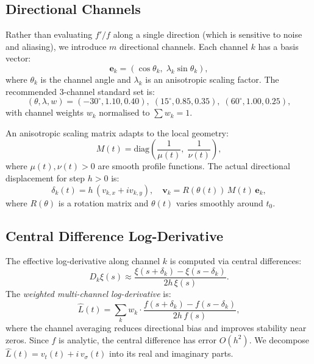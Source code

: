 \documentclass[11pt, a4paper]{article}
\theoremstyle{definition}
\theoremstyle{plain}
\newcommand{\xif}{\xi}                      %
\newcommand{\Lhat}{\hat{L}}                %
\begin{document}
\subsection{Directional Channels}
\label{sec:channels}

Rather than evaluating $f'/f$ along a single direction (which is
sensitive to noise and aliasing), we introduce $m$ directional channels.
Each channel $k$ has a basis vector:
\begin{equation}
  \mathbf{e}_k = (\cos\theta_k, \;\lambda_k\sin\theta_k),
  \label{eq:channel_vector}
\end{equation}
where $\theta_k$ is the channel angle and $\lambda_k$ is an anisotropic
scaling factor. The recommended 3-channel standard set is:
\begin{equation}
  (\theta, \lambda, w) = (-30^\circ, 1.10, 0.40), \;
  (15^\circ, 0.85, 0.35), \;
  (60^\circ, 1.00, 0.25),
  \label{eq:channel_set}
\end{equation}
with channel weights $w_k$ normalised to $\sum w_k = 1$.

An anisotropic scaling matrix adapts to the local geometry:
\begin{equation}
  M(t) = \mathrm{diag}\!\left(\frac{1}{\mu(t)},\;
  \frac{1}{\nu(t)}\right),
  \label{eq:aniso_scale}
\end{equation}
where $\mu(t), \nu(t) > 0$ are smooth profile functions. The actual
directional displacement for step $h > 0$ is:
\begin{equation}
  \delta_k(t) = h\,(v_{k,x} + iv_{k,y}), \quad
  \mathbf{v}_k = R(\theta(t))\,M(t)\,\mathbf{e}_k,
  \label{eq:displacement}
\end{equation}
where $R(\theta)$ is a rotation matrix and $\theta(t)$ varies smoothly
around $t_0$.


\subsection{Central Difference Log-Derivative}
\label{sec:central_diff}

The effective log-derivative along channel $k$ is computed via central
differences:
\begin{equation}
  D_k\xif(s) \approx
  \frac{\xif(s + \delta_k) - \xif(s - \delta_k)}{2h\,\xif(s)}.
  \label{eq:central_diff}
\end{equation}
The \textit{weighted multi-channel log-derivative} is:
\begin{equation}
  \Lhat(t) = \sum_k w_k \cdot
  \frac{f(s + \delta_k) - f(s - \delta_k)}{2h\,f(s)},
  \label{eq:lhat}
\end{equation}
where the channel averaging reduces directional bias and improves
stability near zeros. Since $f$ is analytic, the central difference
has error $O(h^2)$. We decompose $\Lhat(t) = v_t(t) + i\,v_\sigma(t)$
into its real and imaginary parts.
\end{document}
